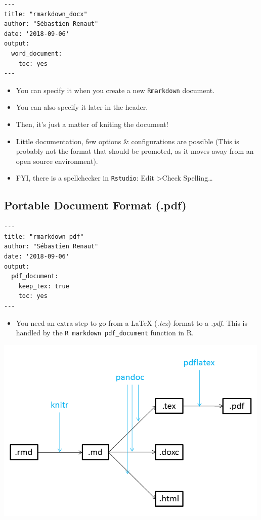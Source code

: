 \documentclass[]{article}
\providecommand{\tightlist}{%
  \setlength{\itemsep}{0pt}\setlength{\parskip}{0pt}}
\begin{document}
\begin{verbatim}
---  
title: "rmarkdown_docx"  
author: "Sébastien Renaut"  
date: '2018-09-06'  
output: 
  word_document: 
    toc: yes
---   
\end{verbatim}

\begin{itemize}
\item
  You can specify it when you create a new \texttt{Rmarkdown} document.
\item
  You can also specify it later in the header.
\item
  Then, it's just a matter of kniting the document!
\item
  Little documentation, few options \& configurations are possible (This
  is probably not the format that should be promoted, as it moves away
  from an open source environment).
\item
  FYI, there is a spellchecker in \texttt{Rstudio}: Edit
  \textgreater{}Check Spelling\ldots{}
\end{itemize}

\hypertarget{portable-document-format-.pdf}{%
\subsection{Portable Document Format
(.pdf)}\label{portable-document-format-.pdf}}

\begin{verbatim}
---    
title: "rmarkdown_pdf"    
author: "Sébastien Renaut"    
date: '2018-09-06'    
output: 
  pdf_document:
    keep_tex: true
    toc: yes  
---    
\end{verbatim}

\begin{itemize}
\tightlist
\item
  You need an extra step to go from a LaTeX (\emph{.tex}) format to a
  \emph{.pdf}. This is handled by the
  \texttt{R\ markdown\ pdf\_document} function in R.
\end{itemize}

\includegraphics[width=5.20833in,height=\textheight]{../figures/pandoc1.png}
\end{document}
